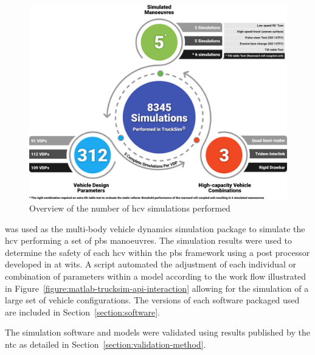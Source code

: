 \begin{figure}[H]
	\centering
	\includegraphics[width=1\textwidth]{fig/Number-of-simulations-Infographic}
	\caption{Overview of the number of \gls{hcv} simulations performed}
	\label{figure:number-of-simulations-overview}
\end{figure}

\trucksim{} was used as the multi-body vehicle dynamics simulation package to simulate the \gls{hcv} performing a set of \gls{pbs} manoeuvres. The simulation results were used to determine the safety of each \gls{hcv} within the \gls{pbs} framework using a post processor developed in \matlab{} at \gls{wits}. A \matlab{} script automated the adjustment of each individual or combination of parameters within a \trucksim{} model according to the work flow illustrated in Figure~\ref{figure:matlab-trucksim-api-interaction} allowing for the simulation of a large set of vehicle configurations. The versions of each software packaged used are included in Section~\ref{section:software}.

The simulation software and models were validated using results published by the \gls{ntc} as detailed in Section~\ref{section:validation-method}.

